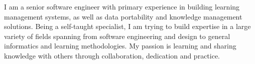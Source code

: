 \documentclass[9pt]{developercv} %
\begin{document}
\vspace{0.5cm}



\begin{minipage}[t]{0.4\textwidth} %
	\vspace{-\baselineskip} %
	{I am a senior software engineer with primary experience in building learning management systems, as well as data portability and knowledge management solutions.}
	{Being a self-taught specialist, I am trying to build expertise in a large variety of fields spanning from software engineering and design to general informatics and learning methodologies.}
	{My passion is learning and sharing knowledge with others through collaboration, dedication and practice.}
\end{minipage}
\hfill %
\begin{minipage}[t]{0.5\textwidth} %
	\vspace{-\baselineskip} %
	\begin{barchart}{5.5}
	\end{barchart}
\end{minipage}


\end{document}
